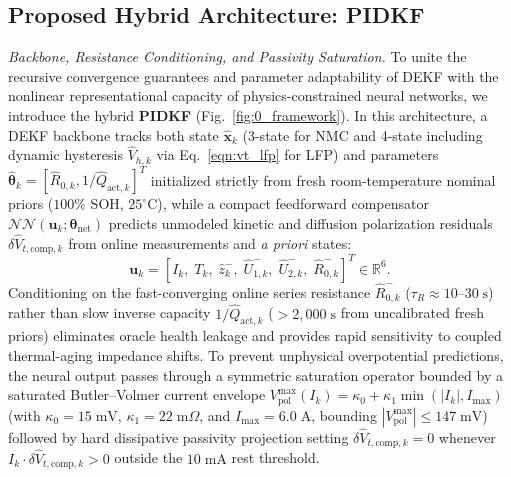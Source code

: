 \documentclass[11pt,a4paper]{article}
\begin{document}
\subsection{Proposed Hybrid Architecture: PIDKF}\label{sec:pidkf}
\emph{Backbone, Resistance Conditioning, and Passivity Saturation.} To unite the recursive convergence guarantees and parameter adaptability of DEKF with the nonlinear representational capacity of physics-constrained neural networks, we introduce the hybrid \textbf{PIDKF} (Fig.~\ref{fig:0_framework}). In this architecture, a DEKF backbone tracks both state $\hat{\mathbf{x}}_k$ (3-state for NMC and 4-state including dynamic hysteresis $\hat{V}_{h,k}$ via Eq.~\eqref{eqn:vt_lfp} for LFP) and parameters $\hat{\boldsymbol{\theta}}_k = [\hat{R}_{0,k}, 1/\hat{Q}_{\text{act},k}]^T$ initialized strictly from fresh room-temperature nominal priors ($100\%$ SOH, $25^\circ\text{C}$), while a compact feedforward compensator $\mathcal{NN}(\mathbf{u}_k; \boldsymbol{\theta}_{\text{net}})$ predicts unmodeled kinetic and diffusion polarization residuals $\delta\hat{V}_{t,\text{comp},k}$ from online measurements and \emph{a priori} states:
\begin{equation}\label{eqn:pidkf_input}
\mathbf{u}_k = \left[I_k,\; T_k,\; \hat{z}_k^-,\; \hat{U}_{1,k}^-,\; \hat{U}_{2,k}^-,\; \hat{R}_{0,k}^-\right]^T \in \mathbb{R}^6.
\end{equation}
Conditioning on the fast-converging online series resistance $\hat{R}_{0,k}^-$ ($\tau_R \approx 10\text{--}30\;\mathrm{s}$) rather than slow inverse capacity $1/\hat{Q}_{\text{act},k}$ ($>2,000\;\mathrm{s}$ from uncalibrated fresh priors) eliminates oracle health leakage and provides rapid sensitivity to coupled thermal-aging impedance shifts. To prevent unphysical overpotential predictions, the neural output passes through a symmetric saturation operator bounded by a saturated Butler--Volmer current envelope $V_{\text{pol}}^{\max}(I_k) = \kappa_0 + \kappa_1 \min(|I_k|, I_{\max})$ (with $\kappa_0 = 15\;\mathrm{mV}$, $\kappa_1 = 22\;\mathrm{m}\Omega$, and $I_{\max} = 6.0\;\mathrm{A}$, bounding $|V_{\text{pol}}^{\max}| \le 147\;\mathrm{mV}$) followed by hard dissipative passivity projection setting $\delta\hat{V}_{t,\text{comp},k} = 0$ whenever $I_k \cdot \delta\hat{V}_{t,\text{comp},k} > 0$ outside the $10\;\mathrm{mA}$ rest threshold.
\end{document}
